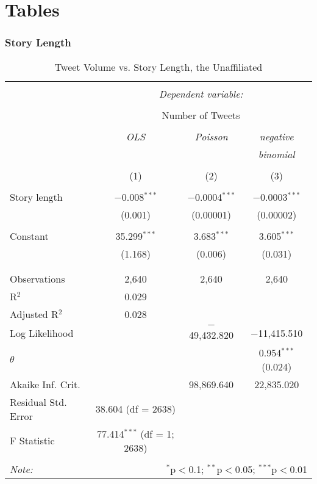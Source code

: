 \chapter{Tables}
\subsection{Story Length}
\begin{table}[!htbp] \centering 
  \caption{Tweet Volume vs. Story Length, the Unaffiliated} 
  \label{} 
    \begin{tabular}{@{\extracolsep{5pt}}lccc} 
    \\[-1.8ex]\hline 
    \hline \\[-1.8ex] 
     & \multicolumn{3}{c}{\textit{Dependent variable:}} \\ 
    \cline{2-4} 
    \\[-1.8ex] & \multicolumn{3}{c}{Number of Tweets} \\ 
    \\[-1.8ex] & \textit{OLS} & \textit{Poisson} & \textit{negative} \\ 
     & \textit{} & \textit{} & \textit{binomial} \\ 
    \\[-1.8ex] & (1) & (2) & (3)\\ 
    \hline \\[-1.8ex] 
     Story length & $-$0.008$^{***}$ & $-$0.0004$^{***}$ & $-$0.0003$^{***}$ \\ 
      & (0.001) & (0.00001) & (0.00002) \\ 
      & & & \\ 
     Constant & 35.299$^{***}$ & 3.683$^{***}$ & 3.605$^{***}$ \\ 
      & (1.168) & (0.006) & (0.031) \\ 
      & & & \\ 
    \hline \\[-1.8ex] 
    Observations & 2,640 & 2,640 & 2,640 \\ 
    R$^{2}$ & 0.029 &  &  \\ 
    Adjusted R$^{2}$ & 0.028 &  &  \\ 
    Log Likelihood &  & $-$49,432.820 & $-$11,415.510 \\ 
    $\theta$ &  &  & 0.954$^{***}$  (0.024) \\ 
    Akaike Inf. Crit. &  & 98,869.640 & 22,835.020 \\ 
    Residual Std. Error & 38.604 (df = 2638) &  &  \\ 
    F Statistic & 77.414$^{***}$ (df = 1; 2638) &  &  \\ 
    \hline 
    \hline \\[-1.8ex] 
    \textit{Note:}  & \multicolumn{3}{r}{$^{*}$p$<$0.1; $^{**}$p$<$0.05; $^{***}$p$<$0.01} \\ 
    \end{tabular} 
\end{table} 
 

